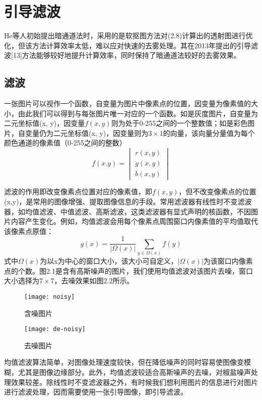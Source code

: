 \documentclass[a4paper, 12pt]{report}
\begin{document}
\section{引导滤波\quad}
He等人初始提出暗通道法时，采用的是软抠图方法对(2.8)计算出的透射图进行优化，但该方法计算效率太低，难以应对快速的去雾处理。其在2013年提出的引导滤波[13]方法能够较好地提升计算效率，同时保持了暗通道法较好的去雾效果。

\subsection{滤波\quad}
一张图片可以视作一个函数，自变量为图片中像素点的位置，因变量为像素值的大小，由此我们可以得到与每张图片唯一对应的一个函数。如是灰度图片，自变量为二元坐标值(x, y)，因变量$f(x, y)$则为处于0-255之间的一个整数值；如是彩色图片，自变量仍为二元坐标值(x, y)，因变量则为$3\times 1$的向量，该向量分量值为每个颜色通道的像素值（0-255之间的整数）
$$ f(x. y) = 
\begin{vmatrix}
  r(x, y) \\
  g(x, y) \\
  b(x, y)  
\end{vmatrix}
$$

滤波的作用即改变像素点位置对应的像素值，即$f(x,y)$，但不改变像素点的位置(x,y)，是常用的图像增强、提取图像信息的手段。常用滤波器有线性时不变滤波器，如均值滤波、中值滤波、高斯滤波，这类滤波器有显式声明的核函数，不因图片内容产生变化。例如，均值滤波会用每个像素点周围窗口内像素值的平均值取代该像素点原值：
$$g(x) = \frac{1}{|\Omega(x)|}\sum_{y \in \Omega(x)}f(y)$$
式中$\Omega(x)$为以x为中心的窗口大小，该大小可自定义，$|\Omega(x)|$为该窗口内像素点的个数。图2.1是含有高斯噪声的图片，我们使用均值滤波对该图片去噪，窗口大小选择为$7\times 7$，去噪效果如图2.2所示。
\begin{figure}[htbp]
\centering
\begin{minipage}[t]{0.48\textwidth}
\centering
\texttt{[image: noisy]}
\caption{含噪图片}
\end{minipage}
\begin{minipage}[t]{0.48\textwidth}
\centering
\texttt{[image: de-noisy]}
\caption{去噪图片}
\end{minipage}
\end{figure}
均值滤波算法简单，对图像处理速度较快，但在降低噪声的同时容易使图像变模糊，{\Large 尤其是图像边缘部分}。此外，均值滤波较适合高斯噪声的去噪，对椒盐噪声处理效果较差。除线性时不变滤波器之外，有时候我们想利用图片的信息进行对图片进行滤波处理，因而需要使用一张引导图像，即引导滤波。
\end{document}
